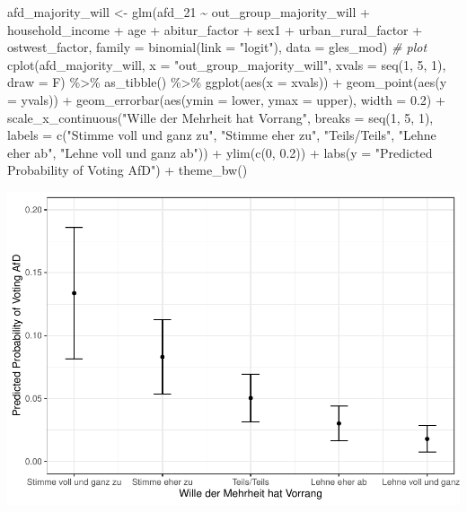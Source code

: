 \documentclass[
]{article}
\newenvironment{Shaded}{\begin{snugshade}}{\end{snugshade}}
\newcommand{\AttributeTok}[1]{\textcolor[rgb]{0.77,0.63,0.00}{#1}}
\newcommand{\CommentTok}[1]{\textcolor[rgb]{0.56,0.35,0.01}{\textit{#1}}}
\newcommand{\DecValTok}[1]{\textcolor[rgb]{0.00,0.00,0.81}{#1}}
\newcommand{\FloatTok}[1]{\textcolor[rgb]{0.00,0.00,0.81}{#1}}
\newcommand{\FunctionTok}[1]{\textcolor[rgb]{0.00,0.00,0.00}{#1}}
\newcommand{\NormalTok}[1]{#1}
\newcommand{\OtherTok}[1]{\textcolor[rgb]{0.56,0.35,0.01}{#1}}
\newcommand{\SpecialCharTok}[1]{\textcolor[rgb]{0.00,0.00,0.00}{#1}}
\newcommand{\StringTok}[1]{\textcolor[rgb]{0.31,0.60,0.02}{#1}}
\begin{document}
\begin{Shaded}
\begin{Highlighting}[]
\NormalTok{afd\_majority\_will }\OtherTok{\textless{}{-}} \FunctionTok{glm}\NormalTok{(afd\_21 }\SpecialCharTok{\textasciitilde{}}\NormalTok{ out\_group\_majority\_will }\SpecialCharTok{+}\NormalTok{ household\_income }\SpecialCharTok{+}\NormalTok{ age }\SpecialCharTok{+}\NormalTok{ abitur\_factor }\SpecialCharTok{+}\NormalTok{ sex1 }\SpecialCharTok{+}\NormalTok{ urban\_rural\_factor }\SpecialCharTok{+}\NormalTok{ ostwest\_factor, }\AttributeTok{family =} \FunctionTok{binomial}\NormalTok{(}\AttributeTok{link =} \StringTok{"logit"}\NormalTok{), }\AttributeTok{data =}\NormalTok{ gles\_mod)}
\CommentTok{\# plot }
\FunctionTok{cplot}\NormalTok{(afd\_majority\_will, }\AttributeTok{x =} \StringTok{"out\_group\_majority\_will"}\NormalTok{, }
      \AttributeTok{xvals =} \FunctionTok{seq}\NormalTok{(}\DecValTok{1}\NormalTok{, }\DecValTok{5}\NormalTok{, }\DecValTok{1}\NormalTok{), }\AttributeTok{draw =}\NormalTok{ F) }\SpecialCharTok{\%\textgreater{}\%}
  \FunctionTok{as\_tibble}\NormalTok{() }\SpecialCharTok{\%\textgreater{}\%}
  \FunctionTok{ggplot}\NormalTok{(}\FunctionTok{aes}\NormalTok{(}\AttributeTok{x =}\NormalTok{ xvals)) }\SpecialCharTok{+}
  \FunctionTok{geom\_point}\NormalTok{(}\FunctionTok{aes}\NormalTok{(}\AttributeTok{y =}\NormalTok{ yvals)) }\SpecialCharTok{+}
  \FunctionTok{geom\_errorbar}\NormalTok{(}\FunctionTok{aes}\NormalTok{(}\AttributeTok{ymin =}\NormalTok{ lower, }\AttributeTok{ymax =}\NormalTok{ upper), }\AttributeTok{width =} \FloatTok{0.2}\NormalTok{) }\SpecialCharTok{+}
  \FunctionTok{scale\_x\_continuous}\NormalTok{(}\StringTok{"Wille der Mehrheit hat Vorrang"}\NormalTok{, }
                     \AttributeTok{breaks =} \FunctionTok{seq}\NormalTok{(}\DecValTok{1}\NormalTok{, }\DecValTok{5}\NormalTok{, }\DecValTok{1}\NormalTok{),}
                     \AttributeTok{labels =} \FunctionTok{c}\NormalTok{(}\StringTok{"Stimme voll und ganz zu"}\NormalTok{, }\StringTok{"Stimme eher zu"}\NormalTok{, }
                                \StringTok{"Teils/Teils"}\NormalTok{, }\StringTok{"Lehne eher ab"}\NormalTok{, }
                                \StringTok{"Lehne voll und ganz ab"}\NormalTok{)) }\SpecialCharTok{+}
  \FunctionTok{ylim}\NormalTok{(}\FunctionTok{c}\NormalTok{(}\DecValTok{0}\NormalTok{, }\FloatTok{0.2}\NormalTok{)) }\SpecialCharTok{+}
  \FunctionTok{labs}\NormalTok{(}\AttributeTok{y =} \StringTok{"Predicted Probability of Voting AfD"}\NormalTok{) }\SpecialCharTok{+}
  \FunctionTok{theme\_bw}\NormalTok{()}
\end{Highlighting}
\end{Shaded}

\includegraphics{AVCD_Final_Assignment-Edenhofer_files/figure-latex/afd-majority-will-1.pdf}
\end{document}
